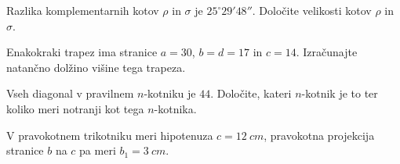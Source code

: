 \documentclass[addpoints]{exam}
\begin{document}
\begin{questions}


    \question[5]
    Razlika komplementarnih kotov $\rho$ in $\sigma$ je $25^\circ 29' 48''$.
    Določite velikosti kotov $\rho$ in $\sigma$.

    \begin{solution}[9cm]
        
    \end{solution}



    \question[4]
    Enakokraki trapez ima stranice $a=30$, $b=d=17$ in $c=14$. Izračunajte natančno dolžino višine tega trapeza.


    \begin{solution}[5cm]
        
    \end{solution}






    

    \newpage

    \question[4]
    Vseh diagonal v pravilnem $n$-kotniku je $44$. Določite, kateri $n$-kotnik je to ter koliko meri notranji kot tega $n$-kotnika.

    \begin{solution}[9cm]
        
    \end{solution}



    \question
    V pravokotnem trikotniku meri hipotenuza $c=12~cm$, pravokotna projekcija stranice $b$ na $c$ pa meri $b_1=3~cm$.
\end{questions}
\end{document}
